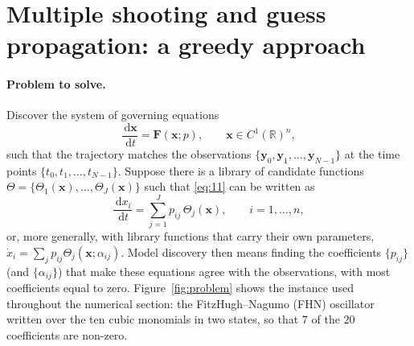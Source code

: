 \documentclass[11pt]{article}
\theoremstyle{remark}\newtheorem{remark}{Remark}
\newcommand{\dd}{\,\mathrm{d}}
\begin{document}
\begin{abstract}
pass (\S\ref{sec:prov}). Two theoretical-premise checks are \emph{not evaluated}: the closure condition (A1) of \S\ref{sec:defs}, and the reconnection hypothesis (R) relating the constrained minimisers of the theory to the unconstrained iterates reported in \S\ref{sec:num}. Inserting the indicative constants carried over from the R002 probe box into (A1) produces enormous factors for long windows, which motivates --- but does not establish --- the infeasibility of a useful admissible region. Every statement of \S\ref{sec:theory}--\S\ref{sec:removal} is therefore conditional, at every stage of the schedule.
\end{abstract}

\tableofcontents

\section{Multiple shooting and guess propagation: a greedy approach}\label{sec:intro}

\paragraph{Problem to solve.} Discover the system of governing equations
\begin{equation}
\frac{\dd\mathbf x}{\dd t}=\mathbf F(\mathbf x;p),\qquad \mathbf x\in C^1(\mathbb R)^{n},
\label{eq:11}
\end{equation}
such that the trajectory matches the observations $\{\mathbf y_0,\mathbf y_1,\dots,\mathbf y_{N-1}\}$ at the time points $\{t_0,t_1,\dots,t_{N-1}\}$. Suppose there is a library of candidate functions $\Theta=\{\Theta_1(\mathbf x),\dots,\Theta_J(\mathbf x)\}$ such that \eqref{eq:11} can be written as
\begin{equation}
\frac{\dd x_i}{\dd t}=\sum_{j=1}^{J}p_{ij}\,\Theta_j(\mathbf x),\qquad i=1,\dots,n,
\label{eq:12}
\end{equation}
or, more generally, with library functions that carry their own parameters, $\dot x_i=\sum_j p_{ij}\Theta_j(\mathbf x;\alpha_{ij})$. Model discovery then means finding the coefficients $\{p_{ij}\}$ (and $\{\alpha_{ij}\}$) that make these equations agree with the observations, with most coefficients equal to zero. Figure~\ref{fig:problem} shows the instance used throughout the numerical section: the FitzHugh--Nagumo (FHN) oscillator written over the ten cubic monomials in two states, so that $7$ of the $20$ coefficients are non-zero.
\end{document}

